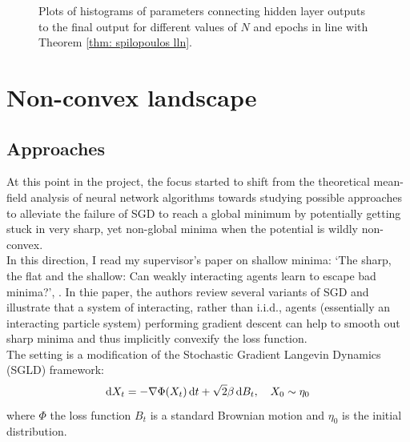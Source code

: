 \documentclass{article}
\begin{document}
\begin{figure}[H]
\caption{Plots of histograms of parameters connecting hidden layer outputs to the final output for different values of $N$ and epochs in line with Theorem \ref{thm: spilopoulos lln}.}
\label{fig: MNIST spiliopoulos}
\end{figure}

\section{Non-convex landscape}

\subsection{Approaches}

At this point in the project, the focus started to shift from the theoretical mean-field analysis of neural network algorithms towards studying possible approaches to alleviate the failure of SGD to reach a global minimum by potentially getting stuck in very sharp, yet non-global minima when the potential is wildly non-convex.\\ 

In this direction, I read my supervisor's paper on shallow minima: ‘The sharp, the flat and the shallow: Can weakly interacting agents learn to escape bad minima?’, \cite{kantas2019sharpflatshallowweakl}. In thie paper, the authors review several variants of SGD and illustrate that a system of interacting, rather than i.i.d., agents (essentially an interacting particle system) performing gradient descent can help to smooth out sharp minima and thus implicitly convexify
the loss function.\\ 

The setting is a modification of the Stochastic Gradient Langevin Dynamics (SGLD) framework:
\begin{equation}\label{eq: SGLD}
	\operatorname{d}\! X_{t} = -\nabla \Phi(X_{t})\operatorname{d}\! t + \sqrt{2}\beta \operatorname{d}\!  B_{t}, \quad X_{0}\sim \eta_{0}
\end{equation}
where $ \Phi$ the loss function $ B_{t}$ is a standard Brownian motion and $ \eta_{0}$ is the initial distribution.
\end{document}
